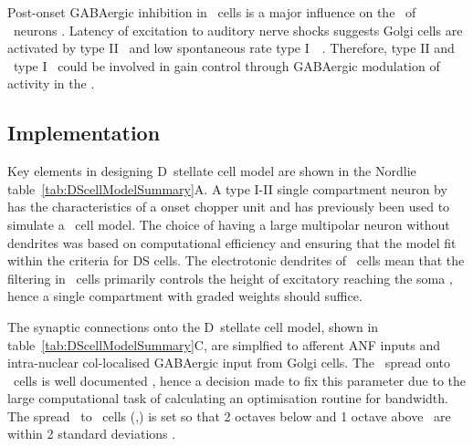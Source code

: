 
Post-onset GABAergic inhibition in \DS~cells is a major influence on the
\PSTH~of \OnC~neurons \citep{FerragamoGoldingEtAl:1998a,EvansZhao:1998}. Latency
of excitation to auditory nerve shocks suggests Golgi cells are activated by
type II \ANFs~and low spontaneous rate type I~\ANFs~\citep{BensonBerglundEtAl:1996, FerragamoGoldingEtAl:1998}. Therefore,
type II and \LSR~type I \ANFs~could be involved in gain control through
GABAergic modulation of activity in the \VCN.






\subsection{Implementation    \label{sec:DS:implementation}}
 

Key elements in designing D~stellate cell model are shown in the Nordlie
table~\ref{tab:DScellModelSummary}A. A type I-II single compartment neuron
by \citet{RothmanManis:2003b} has the characteristics of a onset chopper
unit and has previously been used to simulate a \DS~cell model. The choice
of having a large multipolar neuron without dendrites was based on
computational efficiency and ensuring that the model fit within the
criteria for DS cells. The electrotonic dendrites of \DS~cells mean that
the filtering in \DS~cells primarily controls the height of excitatory
{\PSPs} reaching the soma \citep{WhiteYoungEtAl:1994}, hence a single
compartment with graded weights should suffice. 


The synaptic connections onto the
D~stellate cell model, shown in table~\ref{tab:DScellModelSummary}C, are
simplfied to afferent ANF inputs and intra-nuclear col-localised GABAergic input
from Golgi cells. The \ANF~spread onto \DS~cells is well documented
\citep{PaoliniClark:1999,ArnottWallaceEtAl:2004,PalmerWallaceEtAl:2003,JiangPalmerEtAl:1996,PalmerJiangEtAl:1996},
hence a decision made to fix this parameter due to the large computational task
of calculating an optimisation routine for \ANFDS bandwidth.  The spread \ANF~to
\DS~cells (\sANFDSh,\sANFDSl) is set so that 2 octaves below and 1 octave above
\CF~are within 2 standard deviations \citep{PaoliniClark:1999}.


